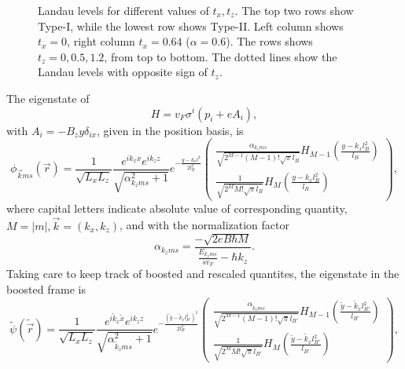 \begin{figure}[p!]
  \centering
  
  \caption{\label{fig:llevelstilt}Landau levels for different values of \( t_x, t_z \).
    The top two rows show Type-I, while the lowest row shows Type-II.
    Left column shows \( t_x = 0 \), right column \( t_x = 0.64 \) (\( \alpha = 0.6 \)).
    The rows shows \( t_z = 0, 0.5, 1.2 \), from top to bottom.
    The dotted lines show the Landau levels with opposite sign of \( t_z \).
  }
\end{figure}

The eigenstate of
\[
H = v_{F} \sigma ^{i} ( p_{i} + e A_{i} ),
\]
with \(A_{i} = - B_{z} y \delta _{i x}\), given in the position basis, is
\begin{equation}
  \phi _{\vec{k} m s}(\vec{r}) = \frac{1}{\sqrt{L_xL_z}}
  \frac{e^{ik_x x}e^{ik_z z}}{\sqrt{\alpha_{k_z m s}^2 + 1}}
  e^{-\frac{y-k_x l^2}{2 l_B^2}}
  \begin{pmatrix}
    \frac{\alpha_{k_z m s}}{\sqrt{2^{M-1} (M-1)! \sqrt{\pi } l_B}} H_{M-1}\left( \frac{y-k_x l_B^2}{l_B} \right)\\
    \frac{1}{\sqrt{2^M M! \sqrt{\pi } l_B}} H_M \left( \frac{y-k_x l_B^2}{l_B} \right)
  \end{pmatrix},
\end{equation}
where capital letters indicate absolute value of corresponding quantity, $M=|m|, \vec{k} = (k_x, k_z)$, and with the normalization factor
\begin{equation}
  \alpha_{k_z m s} = \frac{-\sqrt{2eB\hbar M}}{\frac{E_{k_z m s}}{s v_{F}} - \hbar  k_z}.
\end{equation}
Taking care to keep track of boosted and rescaled quantites, the eigenstate in the boosted frame is
\begin{equation}
  \label{eq:34}
  \tilde{\psi}(\tilde{\vec{r}}) =
  \frac{1}{\sqrt{L_xL_z}}
  \frac{e^{i \tilde{k}_x \tilde{x}}e^{i k_z z}}{\sqrt{\alpha_{\tilde{k}_z m s}^2 + 1}}
  e^{-\frac{\left(\tilde{y} - \tilde{k}_x l_{B'}^2\right)^2}{2 l_{B'}^2}}
  \begin{pmatrix}
    \frac{\alpha_{\tilde{k}_z m s}}{\sqrt{2^{M-1} (M-1)! \sqrt{\pi } l_{B'}}} H_{M-1}\left( \frac{\tilde{y} - \tilde{k}_x l_{B'}^2}{l_{B'}} \right)\\
    \frac{1}{\sqrt{2^M M! \sqrt{\pi } l_{B'}}} H_M \left( \frac{\tilde{y} - \tilde{k}_x l_{B'}^2}{l_{B'}} \right)
  \end{pmatrix},
\end{equation}
